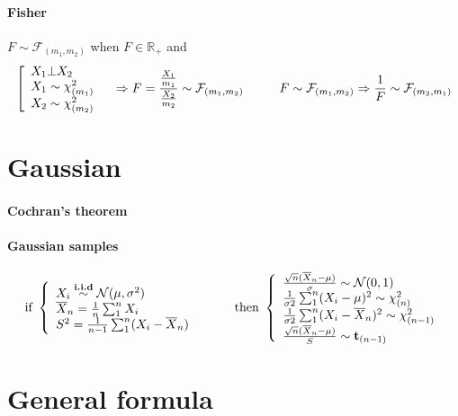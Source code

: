 \documentclass[a4paper,10pt]{article}
\begin{document}
\paragraph{Fisher} $F\sim \mathcal{F}_{(m_1,m_2)}$ when  $F \in \mathbb{R}_+$ and
\[
\left[
\begin{array}{l}
X_1 \bot X_2            \\
X_1 \sim \chi^2_{(m_1)} \\
X_2 \sim \chi^2_{(m_2)}
\end{array}\right.
\hspace{3mm} \Rightarrow
F=\frac{\frac{X_1}{m_1}}{\frac{X_2}{m_2}} \sim \mathcal{F}_{(m_1,m_2)}
\hspace{10mm}
F\sim \mathcal{F}_{(m_1,m_2)} \Rightarrow \frac{1}{F} \sim \mathcal{F}_{(m_2,m_1)} 
\]



\section{Gaussian}
\paragraph{Cochran's theorem}

\paragraph{Gaussian samples}
\[
\text{if }
\left\{
\begin{array}{l}
X_i \stackrel{\textbf{i.i.d}}{\sim} \mathcal{N}(\mu, \sigma^2) \\
\overline{X}_n = \frac{1}{n}\sum^n_1 X_i \\
S^2 = \frac{1}{n-1}\sum^n_1 (X_i - \overline{X}_n) 
\end{array}\right.
\hspace{10mm}
\text{then }
\left\{
\begin{array}{l}
\frac{\sqrt{n} (\overline{X}_n - \mu)}{\sigma} \sim \mathcal{N}(0,1) \\
\frac{1}{\sigma2}\sum^n_1 (X_i - \mu)^2 \sim \chi^2_{(n)} \\
\frac{1}{\sigma2}\sum^n_1 (X_i - \overline{X}_n)^2 \sim \chi^2_{(n-1)} \\
\frac{\sqrt{n} (\overline{X}_n - \mu)}{S} \sim \textbf{t}_{(n-1)}
\end{array}\right.
\]

\section{General formula}
\end{document}
